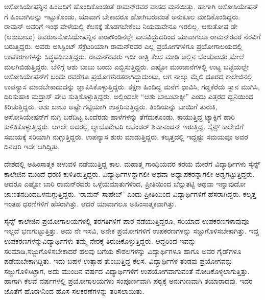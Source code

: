 ಅಸೋಸಿಯೇಷನ್ನಿನ ಹಿಂಬದಿಗೆ ಹೊಂದಿಕೊಂಡಂತೆ ರಾಮನ್‍ರವರ ವಾಸದ ಮನೆಯಿತ್ತು. ಹಾಗಾಗಿ ಅಸೋಸಿಯೇಷನ್ ಗೆ ಹಿಂಬಾಗಿಲನ್ನು ಇಟ್ಟುಕೊಂಡು, ಯಾವಾಗ ಬೇಕಾದರೂ ಹೋಗಿ\-ಬರುವಂತೆ ಅನುಕೂಲ ಮಾಡಿಕೊಂಡಿದ್ದರು. ರಾಮನ್ ಅವರಿಗೆ ಇಂಥ ವೇಳೆಯಲ್ಲಿ ಕೆಲಸಕ್ಕೆ ತೊಡಗಬೇಕೆಂಬ ನಿಯಮವೇನೂ ಇರಲಿಲ್ಲ. ಆಶುತೋಷ ಡೇ (ಆಶುಬಾಬು) ಅವರು\break ಅಸೋಸಿಯೇಷನ್ನಿನ ಕಾಂಪೌಂಡಿನಲ್ಲೇ ವಾಸವಿದ್ದುದರಿಂದ ಯಾವಾಗಲೂ ರಾಮನ್‍ರವರ ನೆರವಿಗೆ ಬರುತ್ತಿದ್ದರು. ಅವರು ಅಸಿಸ್ಟಿಂಟ್ ಸೆಕ್ರೆಟರಿಯಾಗಿ ರಾಮನ್‍ರವರ ಎಲ್ಲ ಪ್ರಯೋಗಗಳಿಗೂ ಪ್ರಯೋಗಾಲಯದಲ್ಲಿ ಉಪ\-ಕರಣಗಳನ್ನು ಸಿದ್ಧಪಡಿಸುತ್ತಿದ್ದರು. ರಾಮನ್‍ರವರು ಇಡೀ ರಾತ್ರಿ ಕೆಲಸ ಮಾಡಿ ಅಲ್ಲಿನ ಬೆಂಚೊಂದರ ಮೇಲೆ ಮಲಗಿಬಿಡುತ್ತಿದ್ದರು. ಬೆಳಿಗ್ಗೆ ಆಶು ಬಾಬು ಬಂದು ಎಬ್ಬಿಸುತ್ತಿದ್ದರು. ಎಷ್ಟೋ ಮುಂಜಾನೆಗಳಲ್ಲಿ ಉಟ್ಟ ಬಟ್ಟೆಯಲ್ಲೇ ಅಸೋಸಿಯೇಷನ್‍ಗೆ ಬಂದು  ರವರೆಗೂ ಪ್ರಯೋಗನಿರತರಾಗಿದ್ದುದುಂಟು. ಆಗ ನಾಲ್ಕು ಮೈಲಿ ದೂರದ ಕಾಲೇಜಿನಲ್ಲಿ ಉಪನ್ಯಾಸ ಮಾಡಬೇಕಾದುದನ್ನು ಜ್ಞಾಪಿಸಿಕೊಳ್ಳುತ್ತಿದ್ದರು. ತಕ್ಷಣ ಹಿಂದಿದ್ದ ಮನೆಗೆ ಧಾವಿಸಿ, ಗಡ್ಡಕೆರೆದು ಸ್ನಾನ ಮುಗಿಸಿ, ದಿರಿಸುಹಾಕಿ ಮದ್ರಾಸ್ ಪೇಟ ಸುತ್ತಿಕೊಳ್ಳುತ್ತಿದ್ದರು. ಅಲ್ಲಿಂದಲೇ “ಆಶು ಬಾಬು\enginline{-}ಟಾಕ್ಸೀ” ಎಂದು ಎತ್ತರದ ಧ್ವನಿಯಿಂದ ಕಿರಿಚುತ್ತಿದ್ದರು. ಆಶು ಬಾಬು ಅಷ್ಟೇ ಗಟ್ಟಿಯಾಗಿ ಉತ್ತರಿಸುತ್ತಿದ್ದರು. ತಿಂಡಿಯನ್ನು ಬಾಯಿಗೆ ತುರುಕಿ, ಅಸೋಸಿಯೇಷನ್‍ಗೆ ನುಗ್ಗಿ ಬರೆದಿಟ್ಟ ಒಂದೆರಡು ಹಾಳೆಗಳನ್ನು ತೆಗೆದುಕೊಂಡು, ಕಾಯುತ್ತಿದ್ದ ಟ್ಯಾಕ್ಸಿಗೆ ಹಾರಿ ಕುಳಿತಿಕೊಳ್ಳುತ್ತಿದ್ದರು. ಆಗಲೇ ಅದರಲ್ಲಿ ಲ್ಯಾಬೊರೇಟರಿ ಅಟೆಂಡರ್ ಶಿವಾನಂದನ್ ಇರುತ್ತಿದ್ದ. ಸೈನ್ಸ್ ಕಾಲೇಜಿಗೆ ಸಮಯಕ್ಕೆ ಸರಿಯಾಗಿ ನುಗ್ಗುತ್ತಿದ್ದರು. ಉಪನ್ಯಾಸ ಶುರು ಮಾಡುತ್ತಿದ್ದರು. ಕಲ್ಕತ್ತದಲ್ಲಿ ಇದ್ದಷ್ಟು ಸಮಯವೂ ಅವರ ದಿನಚರಿ ಇದೇ ಆಗಿದ್ದಿತು.

ದೇಶದಲ್ಲಿ ಅಹಿಂಸಾತ್ಮಕ ಚಳುವಳಿ ನಡೆಯುತ್ತಿದ್ದ ಕಾಲ. ಮಹಾತ್ಮ ಗಾಂಧಿಯವರ ಕರೆಯ ಮೇರೆಗೆ ವಿದ್ಯಾರ್ಥಿಗಳು ಸೈನ್ಸ್ ಕಾಲೇಜಿನ ಮುಂದೆ ಧರಣಿ ಕುಳಿತಿರುತ್ತಿದ್ದರು. ವಿದ್ಯಾರ್ಥಿಗಳನ್ನಾಗಲೀ ಅಥವಾ ಅಧ್ಯಾಪಕರನ್ನಾಗಲೀ ಅಡ್ಡಗಟ್ಟುತ್ತಿದ್ದರು. ಆದರೂ ಎಷ್ಟೋ ಬಾರಿ ರಾಮನ್‍ರವರು ಒಳ್ಳೆಯಮಾತುಗಳಿಂದ, ಪ್ರೀತಿಯಿಂದ ಬೆನ್ನುತಟ್ಟಿ ಅಥವಾ ಇನ್ನಾವುದೋ ಜಾಣತನದಿಂದ\break ಒಳನುಗ್ಗುತ್ತಿದ್ದರು. ‘ರಾಮನ್ ಸಾಹೇಬ್’ ಎಂದು ಪ್ರೀತಿಯಿಂದ ವಿದ್ಯಾರ್ಥಿಗಳಿಗೆ ಹೆಸರಾಗಿದ್ದರು. ಕಲ್ಕತ್ತ ಇಂತಹ ಧರಣಿಗಳಿಗೆ ಹೆಸರಾಗಿತ್ತು. ಆದರೆ ಯಾವಾಗಲೂ ಅಹಿಂಸಾತ್ಮಕವಾಗಿತ್ತು. 

\newpage

ಸೈನ್ಸ್ ಕಾಲೇಜಿನ ಪ್ರಯೋಗಾಲಯಗಳಲ್ಲಿ ತರಗತಿಗಳಿಗೆ ಪಾಠ ನಡೆಯುತ್ತಿದ್ದರೂ, ಸರಿಯಾದ ಉಪಕರಣಗಳಾವುವೂ ಇಲ್ಲದೆ ಭಣಗುಟ್ಟುತ್ತಿತ್ತು. ಅದು ನೇ ಇಸವಿ, ಅನೇಕ ಪ್ರಯೋಗಗಳಿಗೆ ಉಪಕರಣಗಳನ್ನು ಸಜ್ಜುಗೊಳಿಸಬೇಕಾಗಿತ್ತು. ಇದ್ದ ಉಪಕರಣಗಳನ್ನು\break ವಿದ್ಯಾರ್ಥಿಗಳು ತಮ್ಮ ನೇರಕ್ಕೆ ತಿರುಚಿಕೊಳ್ಳುತ್ತಿದ್ದರು. ಆದ್ದರಿಂದ ಇವನ್ನು ಸರಿಮಾಡಿ,\break ಸಜ್ಜುಗೊಳಿಸಬೇಕಾದರೆ ಹಲವು ಬಗೆಯ ಕೌಶಲಗಳನ್ನು ವಿದ್ಯಾರ್ಥಿಗಳೂ ಹಾಗೂ ಅವರ ಗೈಡ್‍ಗಳೂ ಪಡೆಯಬೇಕಾಗಿದ್ದಿತು. ಇದು ಬಹಳ ಉತ್ಸಾಹ ತುಂಬುತ್ತಿದ್ದ ಕೆಲಸ. ವಿದ್ಯಾರ್ಥಿಗಳ ತಂಡವು ಪ್ರಯೋಗವನ್ನು ಸಜ್ಜುಗೊಳಿಸಿಟ್ಟಾಗ, ಅದು ಮುಂದಿನ ವರ್ಷದ ವಿದ್ಯಾರ್ಥಿಗಳಿಗೆ ಉಪಯೋಗ\-ವಾಗುವಂತೆ ನೋಡಿಕೊಳ್ಳಲಾಗುತ್ತಿತ್ತು. ಹಾಗಾಗಿ ಕೆಲವೆ ವರ್ಷಗಳಲ್ಲಿ ಪ್ರಯೋಗಾಲಯಗಳು ಸಂಪೂರ್ಣವಾಗಿ  ಪಠ್ಯಕ್ಕೆ ಅನುಗುಣವಾಗಿ ತಯಾರಾದವು. ಇದರ ಜೊತೆಗೆ ಹೊರಗಿನಿಂದ ಹೊಸ ಸಲಕರಣೆಗಳನ್ನು ತರಿಸಲಾಯಿತು.



